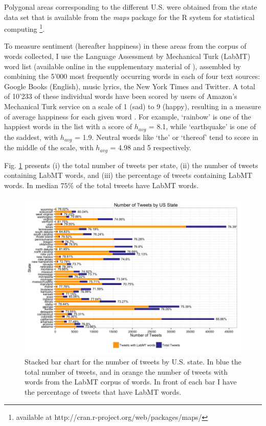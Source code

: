 \documentclass{llncs}
\begin{document}
Polygonal areas corresponding to the different U.S. were obtained from the state data set that is available from the \emph{maps} package for the R system for statistical computing \footnote{available at http://cran.r-project.org/web/packages/maps/}.

To measure sentiment (hereafter happiness) in these areas from the corpus of words collected, I use the Language Assessment by Mechanical Turk (LabMT) word list (available online in the supplementary material of \cite{Dodds2011}), assembled by combining the 5'000 most frequently occurring words in each of four text sources: Google Books (English), music lyrics, the New York Times and Twitter. A total of  10'233 of these individual words have been scored by users of Amazon’s Mechanical Turk service on a scale of 1 (sad) to 9 (happy), resulting in a measure of average happiness for each given word \cite{Kloumann2012}. For example, ‘rainbow’ is one of the happiest words in the list with a score of $h_{avg}$ = 8.1, while ‘earthquake’ is one of the saddest, with $h_{avg}$ = 1.9. Neutral words like ‘the’ or `thereof' tend to score in the middle of the scale, with $h_{avg}$ = 4.98 and 5 respectively.

Fig. \ref{fig:tweets_by_state} presents (i) the total number of tweets per state, (ii) the number of tweets containing LabMT words, and (iii) the percentage of tweets containing LabMT words. In median $75\%$ of the total tweets have LabMT words.

\begin{figure}[!ht]
\centering
\includegraphics[width=\textwidth]{images/tweets_by_state}
\caption{Stacked bar chart for the number of tweets by U.S. state. In blue the total number of tweets, and in orange the number of tweets with words from the LabMT corpus of words. In front of each bar I have the percentage of tweets that have LabMT words.}
\label{fig:tweets_by_state}
\end{figure}
\end{document}
